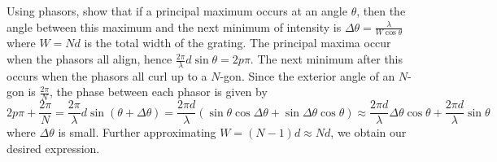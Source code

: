 \documentclass[a4paper]{article}
\begin{document}
\begin{eg}
Using phasors, show that if a principal maximum occurs at an angle $\theta$, then the angle between this maximum and the next minimum of intensity is $\Delta\theta=\frac{\lambda}{W\cos\theta}$ where $W = Nd$ is the total width of the grating. The principal maxima occur when the phasors all align, hence $\frac{2\pi}{\lambda}d\sin\theta=2p\pi$. The next minimum after this occurs when the phasors all curl up to a $N$-gon. Since the exterior angle of an $N$-gon is $\frac{2\pi}{N}$, the phase between each phasor is given by
$$2p\pi+\frac{2\pi}{N}=\frac{2\pi}{\lambda}d\sin(\theta+\Delta\theta)=\frac{2\pi d}{\lambda}(\sin\theta\cos\Delta\theta+\sin\Delta\theta\cos\theta)\approx\frac{2\pi d}{\lambda}\Delta\theta\cos\theta+\frac{2\pi d}{\lambda}\sin\theta$$
where $\Delta\theta$ is small. Further approximating $W=(N-1)d\approx Nd$, we obtain our desired expression.
\end{eg}
\end{document}
